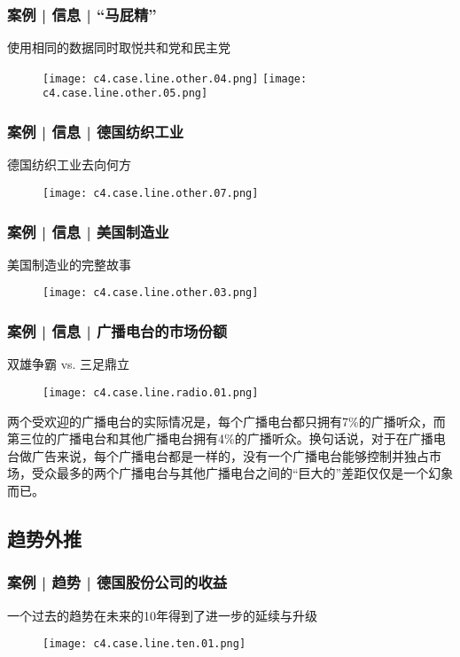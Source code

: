 \begin{frame}
  \frametitle{案例 | 信息 | “马屁精”}
  \begin{block}{使用相同的数据同时取悦共和党和民主党}
    \begin{figure}
      \centering
      \texttt{[image: c4.case.line.other.04.png]}\quad
      \texttt{[image: c4.case.line.other.05.png]}
    \end{figure}
  \end{block}
\end{frame}

\begin{frame}
  \frametitle{案例 | 信息 | 德国纺织工业}
  \begin{block}{德国纺织工业去向何方}
    \begin{figure}
      \centering
      \texttt{[image: c4.case.line.other.07.png]}
    \end{figure}
  \end{block}
\end{frame}

\begin{frame}
  \frametitle{案例 | 信息 | 美国制造业}
  \begin{block}{美国制造业的完整故事}
    \begin{figure}
      \centering
      \texttt{[image: c4.case.line.other.03.png]}
    \end{figure}
  \end{block}
\end{frame}

\begin{frame}
  \frametitle{案例 | 信息 | 广播电台的市场份额}
  \begin{block}{双雄争霸 vs. 三足鼎立}
    \begin{figure}
      \centering
      \texttt{[image: c4.case.line.radio.01.png]}
    \end{figure}
    \vspace{-1em}
    \pause
两个受欢迎的广播电台的实际情况是，每个广播电台都只拥有7\%的广播听众，而第三位的广播电台和其他广播电台拥有4\%的广播听众。换句话说，对于在广播电台做广告来说，每个广播电台都是一样的，没有一个广播电台能够控制并独占市场，受众最多的两个广播电台与其他广播电台之间的“巨大的”差距仅仅是一个幻象而已。
  \end{block}
\end{frame}

\subsection{趋势外推}
\begin{frame}
  \frametitle{案例 | 趋势 | 德国股份公司的收益}
  \begin{block}{一个过去的趋势在未来的10年得到了进一步的延续与升级}
    \begin{figure}
      \centering
      \texttt{[image: c4.case.line.ten.01.png]}
    \end{figure}
  \end{block}
\end{frame}

